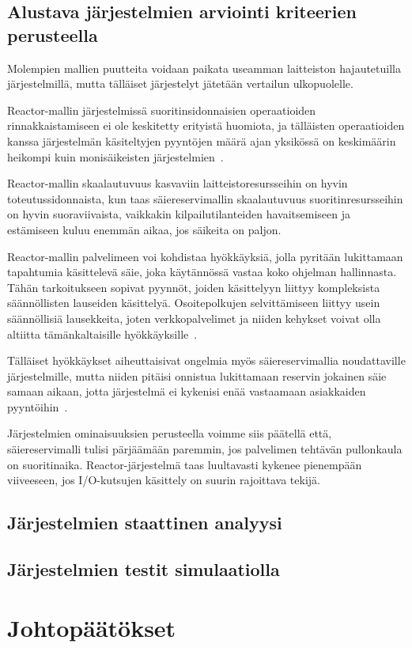 \documentclass[12pt]{article}
\begin{document}
\subsection{Alustava järjestelmien arviointi kriteerien perusteella}
Molempien mallien puutteita voidaan paikata useamman laitteiston hajautetuilla
järjestelmillä, mutta tälläiset järjestelyt jätetään vertailun ulkopuolelle.

Reactor-mallin järjestelmissä suoritinsidonnaisien
operaatioiden rinnakkaistamiseen ei ole keskitetty erityistä huomiota, ja tälläisten operaatioiden
kanssa järjestelmän käsiteltyjen pyyntöjen määrä ajan yksikössä on keskimäärin heikompi
kuin monisäikeisten järjestelmien~\cite{davis_case_2017}.

Reactor-mallin skaalautuvuus kasvaviin laitteistoresursseihin on hyvin
toteutussidonnaista, kun taas
säiereservimallin skaalautuvuus suoritinresursseihin on hyvin suoraviivaista,
vaikkakin kilpailutilanteiden havaitsemiseen ja estämiseen kuluu enemmän aikaa,
jos säikeita on paljon.

Reactor-mallin palvelimeen voi kohdistaa hyökkäyksiä, jolla pyritään
lukittamaan tapahtumia käsittelevä säie, joka käytännössä vastaa koko ohjelman hallinnasta.
Tähän tarkoitukseen sopivat pyynnöt,
joiden käsittelyyn liittyy kompleksista säännöllisten lauseiden käsittelyä.
Osoitepolkujen selvittämiseen liittyy usein säännöllisiä lausekkeita,
joten verkkopalvelimet ja niiden
kehykset voivat olla altiitta tämänkaltaisille hyökkäyksille~\cite{davis_case_2017}.

Tälläiset hyökkäykset aiheuttaisivat ongelmia myös säiereservimallia
noudattaville järjestelmille, mutta niiden pitäisi onnistua
lukittamaan reservin jokainen säie samaan aikaan, jotta
järjestelmä ei kykenisi enää vastaamaan asiakkaiden pyyntöihin~\cite{davis_case_2017}.

Järjestelmien ominaisuuksien perusteella voimme siis päätellä että,
säiereservimalli
tulisi pärjäämään paremmin, jos palvelimen tehtävän pullonkaula on suoritinaika.
Reactor-järjestelmä
taas luultavasti kykenee pienempään viiveeseen,
jos I/O-kutsujen käsittely on suurin rajoittava tekijä.
\subsection{Järjestelmien staattinen analyysi}

\subsection{Järjestelmien testit simulaatiolla}



\section{Johtopäätökset}


\end{document}
